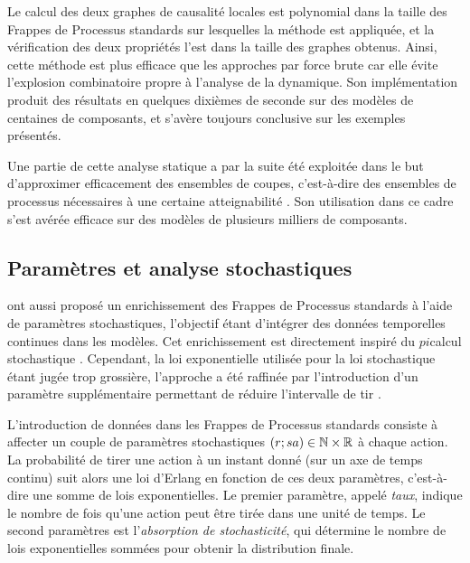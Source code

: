 Le calcul des deux graphes de causalité locales est polynomial dans la taille
des Frappes de Processus standards sur lesquelles la méthode est appliquée,
et la vérification des deux propriétés l'est dans la taille des graphes obtenus.
Ainsi, cette méthode est plus efficace que les approches par force brute
car elle évite l'explosion combinatoire propre à l'analyse de la dynamique.
Son implémentation produit des résultats en quelques dixièmes de seconde sur des modèles
de centaines de composants, et s'avère toujours conclusive sur les exemples présentés.

Une partie de cette analyse statique a par la suite été
exploitée dans le but d'approximer efficacement des ensembles de coupes,
c'est-à-dire des ensembles de processus nécessaires à une certaine atteignabilité
\cite{PAK13-CAV}.
Son utilisation dans ce cadre s'est avérée efficace sur des modèles de plusieurs milliers
de composants.



\subsection{Paramètres et analyse stochastiques}

\cite{PMR10-TCSB} ont aussi proposé un enrichissement des Frappes de Processus standards
à l'aide de paramètres stochastiques,
l'objectif étant d'intégrer des données temporelles continues dans les modèles.
Cet enrichissement est directement inspiré du $pi$\nbd calcul stochastique
\cite{Priami95}.
Cependant, la loi exponentielle utilisée pour la loi stochastique étant jugée trop grossière,
l'approche a été raffinée par l'introduction d'un paramètre supplémentaire permettant
de réduire l'intervalle de tir \cite{PMR10-TSE}.

\myskip

L'introduction de données dans les Frappes de Processus standards
consiste à affecter un couple de paramètres stochastiques $\mathopen{(}r\mathclose{};sa\mathclose{)} \in \mathbb{N} \times \mathbb{R}$
à chaque action.
La probabilité de tirer une action à un instant donné (sur un axe de temps continu)
suit alors une loi d'Erlang en fonction de ces deux paramètres,
c'est-à-dire une somme de lois exponentielles.
Le premier paramètre, appelé \emph{taux}, indique le nombre de fois qu'une action
peut être tirée dans une unité de temps.
Le second paramètres est l'\emph{absorption de stochasticité},
qui détermine le nombre de lois exponentielles sommées pour obtenir la distribution finale.

